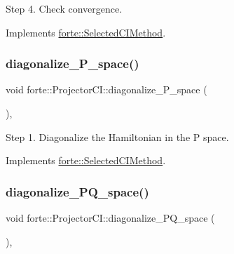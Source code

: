 Step 4. Check convergence. 



Implements \mbox{\hyperlink{classforte_1_1_selected_c_i_method_acc10aa488c79c2abec46a9093ecf5a52}{forte\+::\+Selected\+C\+I\+Method}}.

\mbox{\label{classforte_1_1_projector_c_i_a2fc4f3f5094af2886237188e33f0f8ec}} 
\subsubsection{\texorpdfstring{diagonalize\+\_\+\+P\+\_\+space()}{diagonalize\_P\_space()}}
{\footnotesize\ttfamily void forte\+::\+Projector\+C\+I\+::diagonalize\+\_\+\+P\+\_\+space (\begin{DoxyParamCaption}{ }\end{DoxyParamCaption})\hspace{0.3cm}{\ttfamily [override]}, {\ttfamily [virtual]}}



Step 1. Diagonalize the Hamiltonian in the P space. 



Implements \mbox{\hyperlink{classforte_1_1_selected_c_i_method_a7b2b41da889659f03361f625c6df44d2}{forte\+::\+Selected\+C\+I\+Method}}.

\mbox{\label{classforte_1_1_projector_c_i_ae61e5b098015659c30198655fe0b2679}} 
\subsubsection{\texorpdfstring{diagonalize\+\_\+\+P\+Q\+\_\+space()}{diagonalize\_PQ\_space()}}
{\footnotesize\ttfamily void forte\+::\+Projector\+C\+I\+::diagonalize\+\_\+\+P\+Q\+\_\+space (\begin{DoxyParamCaption}{ }\end{DoxyParamCaption})\hspace{0.3cm}{\ttfamily [override]}, {\ttfamily [virtual]}}



